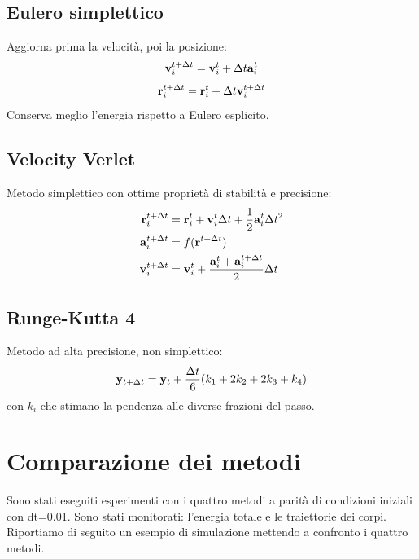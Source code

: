 \documentclass[a4paper,12pt]{article}
\begin{document}
\subsection*{Eulero simplettico}
Aggiorna prima la velocit\`a, poi la posizione:
\begin{equation}
    \vb{v}_i^{t+\Delta t} = \vb{v}_i^t + \Delta t \vb{a}_i^t
\end{equation}
\begin{equation}
    \vb{r}_i^{t+\Delta t} = \vb{r}_i^t + \Delta t \vb{v}_i^{t+\Delta t}
\end{equation}
Conserva meglio l'energia rispetto a Eulero esplicito.

\subsection*{Velocity Verlet}
Metodo simplettico con ottime proprietà di stabilità e precisione:
\begin{align}
    \vb{r}_i^{t+\Delta t} &= \vb{r}_i^t + \vb{v}_i^t \Delta t + \frac{1}{2} \vb{a}_i^t \Delta t^2 \\
    \vb{a}_i^{t+\Delta t} &= f(\vb{r}^{t+\Delta t}) \\
    \vb{v}_i^{t+\Delta t} &= \vb{v}_i^t + \frac{\vb{a}_i^t + \vb{a}_i^{t+\Delta t}}{2} \Delta t
\end{align}

\subsection*{Runge-Kutta 4}
Metodo ad alta precisione, non simplettico:
\begin{equation}
    \vb{y}_{t+\Delta t} = \vb{y}_t + \frac{\Delta t}{6}(k_1 + 2k_2 + 2k_3 + k_4)
\end{equation}
con $k_i$ che stimano la pendenza alle diverse frazioni del passo.

\section{Comparazione dei metodi}
Sono stati eseguiti esperimenti con i quattro metodi a parit\`a di condizioni iniziali con dt=0.01. Sono stati monitorati: l'energia totale e le traiettorie dei corpi. \\Riportiamo di seguito un esempio di simulazione mettendo a confronto i quattro metodi.
\end{document}
